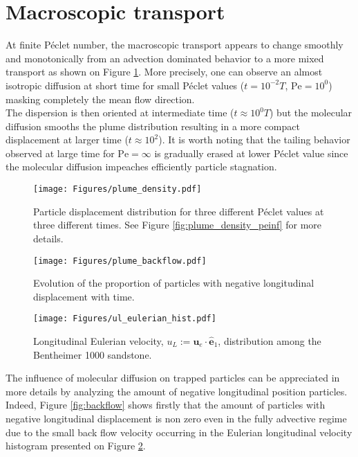 \section{Macroscopic transport}
At finite Péclet number, the macroscopic transport appears to change smoothly and monotonically from an advection dominated behavior to a more mixed transport as shown on Figure \ref{fig:plume_density}.
More precisely, one can observe an almost isotropic diffusion at short time for small Péclet values ($t=10^{-2}T$, $\mathrm{Pe} = 10^0$) masking completely the mean flow direction.\\
The dispersion is then oriented at intermediate time ($t\approx 10^0T$) but the molecular diffusion smooths the plume distribution resulting in a more compact displacement at larger time ($t\approx 10^2$).
It is worth noting that the tailing behavior observed at large time for $\mathrm{Pe}=\infty$ is gradually erased at lower Péclet value since the molecular diffusion impeaches efficiently particle stagnation.\\
\begin{figure}[h!]
	\centering
	\texttt{[image: Figures/plume\_density.pdf]}
	\caption{Particle displacement distribution for three different Péclet values at three different times. See Figure \ref{fig:plume_density_peinf} for more details.}
	\label{fig:plume_density}
\end{figure}
\begin{figure}[h!]
	\centering
	\begin{minipage}{.49\textwidth}
		\centering
		\texttt{[image: Figures/plume\_backflow.pdf]}
		\caption{Evolution of the proportion of particles with negative longitudinal displacement with time.}
		\label{fig:backflow}
	\end{minipage}%
	\begin{minipage}{.49\textwidth}
		\centering
		\texttt{[image: Figures/ul\_eulerian\_hist.pdf]}
		\caption{Longitudinal Eulerian velocity, $u_L:=\textbf{u}_e\cdot\hat{\textbf{e}}_1$, distribution among the Bentheimer 1000 sandstone.}
		\label{fig:ul_eulerian_hist}
	\end{minipage}
\end{figure}
The influence of molecular diffusion on trapped particles can be appreciated in more details by analyzing the amount of negative longitudinal position particles. 
Indeed, Figure \ref{fig:backflow} shows firstly that the amount of particles with negative longitudinal displacement is non zero even in the fully advective regime due to the small back flow velocity occurring in the Eulerian longitudinal velocity histogram presented on Figure \ref{fig:ul_eulerian_hist}.\\
